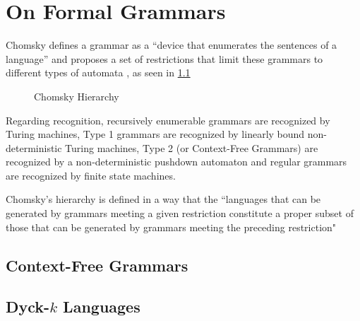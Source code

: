 \chapter{On Formal Grammars}

Chomsky defines a grammar as a ``device that enumerates the sentences of a language'' and proposes a set of restrictions that limit these grammars to different types of automata \cite{chomsky-hierarchy}, as seen in \ref{fig:chomsky-fig}

\begin{figure}[h]
    \centering
    \caption{Chomsky Hierarchy}
    \label{fig:chomsky-fig}
\end{figure}

Regarding recognition, recursively enumerable grammars are recognized by Turing machines, Type 1 grammars are recognized by linearly bound non-deterministic Turing machines, Type 2 (or Context-Free Grammars) are recognized by a non-deterministic pushdown automaton and regular grammars are recognized by finite state machines.

Chomsky's hierarchy is defined in a way that the ``languages that can be generated by grammars meeting a given restriction constitute a proper subset of those that can be generated by grammars meeting the preceding restriction" \cite{chomsky-hierarchy}



\section{Context-Free Grammars}

\section{Dyck-$k$ Languages}